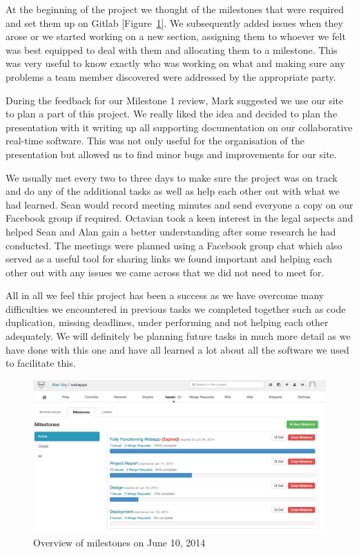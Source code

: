 \documentclass[a4wide, 11pt]{article}
\begin{document}
At the beginning of the project we thought of the milestones that were required and set them up on Gitlab [Figure~\ref{fig:Github}]. We subsequently added issues when they arose or we started working on a new section, assigning them to whoever we felt was best equipped to deal with them and allocating them to a milestone. This was very useful to know exactly who was working on what and making sure any problems a team member discovered were addressed by the appropriate party. 

During the feedback for our Milestone 1 review, Mark suggested we use our site to plan a part of this project. We really liked the idea and decided to plan the presentation with it writing up all supporting documentation on our collaborative real-time software. This was not only useful for the organisation of the presentation but allowed us to find minor bugs and improvements for our site. 

We usually met every two to three days to make sure the project was on track and do any of the additional tasks as well as help each other out with what we had learned. Sean would record meeting minutes and send everyone a copy on our Facebook group if required. Octavian took a keen interest in the legal aspects and helped Sean and Alan gain a better understanding after some research he had conducted. The meetings were planned using a Facebook group chat which also served as a useful tool for sharing links we found important and helping each other out with any issues we came across that we did not need to meet for.

All in all we feel this project has been a success as we have overcome many difficulties we encountered in previous tasks we completed together such as code duplication, missing deadlines, under performing and not helping each other adequately. We will definitely be planning future tasks in much more detail as we have done with this one and have all learned a lot about all the software we used to facilitate this.

\begin{figure}
\includegraphics[width=1\textwidth]{gitlab-milestones.png}
\caption{Overview of milestones on June 10, 2014}
\label{fig:Github}
\end{figure}
\end{document}
